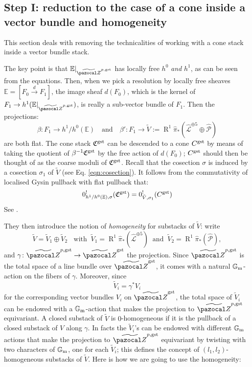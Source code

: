 \documentclass[11pt]{amsart}
\renewcommand{\to}{\rightarrow}
\newcommand{\tZ}{\widetilde{\pazocal Z}}
\newcommand{\R}{\operatorname{R}}
\newcommand{\Gm}{\mathbb{G}_{\rm{m}}}
\theoremstyle{plain}
\theoremstyle{definition}
\begin{document}
\subsection*{Step I: reduction to the case of a cone inside a vector bundle and homogeneity}
This section deals with removing the technicalities of working with a cone stack inside a vector bundle stack.

The key point is that $\mathbb E\rvert_{\tZ^{p,\rm{gst}}}$ has locally free $h^0$ \emph{and} $h^1$, as can be seen from the equations. Then, when we pick a resolution by locally free sheaves $\mathbb E=[F_0\xrightarrow{d} F_1]$, the image sheaf $d(F_0)$, which is the kernel of $F_1\to h^1(\mathbb E\rvert_{\tZ^{p,\rm{gst}}})$, is really a sub-vector bundle of $F_1$. Then the projections:
\[
 \beta\colon F_1\to h^1/h^0(\mathbb E) \quad \text{and} \quad \beta'\colon F_1\to \tilde{V}:=\R^1\hat{\pi}_*(\hat{\mathcal L}^{\oplus 5}\oplus\widehat{\mathcal P})
\]
are both flat. The cone stack $\mathfrak C^{\rm{gst}}$ can be descended to a cone $C^{\rm{gst}}$ by means of taking the quotient of $\beta^{-1}\mathfrak C^{\rm{gst}}$ by the free action of $d(F_0)$; $C^{\rm{gst}}$ should then be thought of as the coarse moduli of $\mathfrak C^{\rm{gst}}$. Recall that the cosection $\sigma$ is induced by a cosection $\sigma_1$ of $\tilde V$ (see Eq. \eqref{eqn:cosection}). 
It follows from the commutativity of localised Gysin pullback with flat pullback that:
\[
 0^!_{h^1/h^0(\mathbb E),\sigma}(\mathfrak C^{\rm{gst}})= 0^!_{\tilde V,\sigma_1}(C^{\rm{gst}})
\]
See \cite[Proposition 6.3]{CLpfields}.

They then introduce the notion of \emph{homogeneity} for substacks of $\tilde V$: write 
\[\tilde V=\tilde V_1\oplus\tilde V_2\;\;\text{ with} \;\;\tilde V_1=\R^1\hat{\pi}_*(\hat{\mathcal L}^{\oplus 5})\;\; \text{and}\;\; \tilde V_2=\R^1\hat{\pi}_*(\widehat{\mathcal P}),\]
 and $\gamma\colon \tZ^{p,\rm{gst}}\to\tZ^{\rm{gst}}$ the projection. Since $\tZ^{p,\rm{gst}}$ is the total space of a line bundle over $\tZ^{\rm{gst}}$, it comes with a natural $\Gm$-action on the fibers of $\gamma$. Moreover, since 
 \[\tilde V_i=\gamma^*V_i\]
 for the corresponding vector bundles $V_i$ on $\tZ^{\rm{gst}}$, the total space of $\tilde V_i$ can be endowed with a $\Gm$-action that makes the projection to $\tZ^{p,\rm{gst}}$ equivariant. A closed substack of $\tilde V$ is $0$-homogeneous if it is the pullback of a closed substack of $V$ along $\gamma$. In facts the $\tilde V_i$'s can be endowed with different $\Gm$ actions that make the projection to $\tZ^{p,\rm{gst}}$ equivariant by twisting with two characters of $\Gm$, one for each $\tilde V_i$; this defines the concept of $(l_1,l_2)$-homogeneous substacks of $\tilde V$. Here is how we are going to use the homogeneity:
\end{document}
